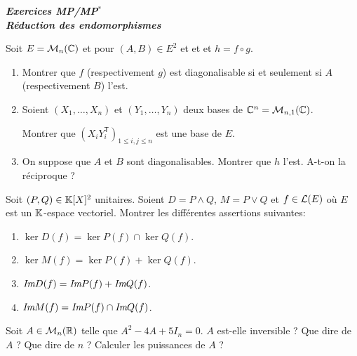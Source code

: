 \documentclass[12pt]{article}
\begin{document}
\begin{titlepage}
	\centering
	\vspace*{\fill}
	\Huge \textit{\textbf{Exercices MP/MP$^*$\\ Réduction des endomorphismes}}
	\vspace*{\fill}
\end{titlepage}

\begin{exercise}
	Soit $E=\mathcal{M}_{n}(\mathbb{C})$ et pour $(A,B)\in E^{2}$ et  et  et $h=f\circ g$.
	\begin{enumerate}
		\item Montrer que $f$ (respectivement $g$) est diagonalisable si et seulement si $A$ (respectivement $B$) l'est.
		\item Soient $(X_{1},\dots,X_{n})$ et $(Y_{1},\dots,Y_{n})$ deux bases de $\mathbb{C}^{n}=\mathcal{M}_{n,1}(\mathbb{C})$.
		
		Montrer que $(X_{i}Y_{i}^{\mathsf{T}})_{1\leqslant i,j\leqslant n}$ est une base de $E$.
		\item On suppose que $A$ et $B$ sont diagonalisables. Montrer que $h$ l'est. A-t-on la réciproque ?
	\end{enumerate}
\end{exercise}

\begin{exercise}
	Soit $(P,Q)\in\mathbb{K}[X]^{2}$ unitaires. Soient $D=P\wedge Q$, $M=P\vee Q$ et $f\in\mathcal{L}(E)$ où $E$ est un $\mathbb{K}$-espace vectoriel.
	Montrer les différentes assertions suivantes:
	\begin{enumerate}
		\item $\ker D(f)=\ker P(f)\cap \ker Q(f)$.
		\item $\ker M(f)=\ker P(f)+ \ker Q(f)$.
		\item $\emph{Im} D(f)=\emph{Im} P(f)+\emph{Im} Q(f)$.
		\item $\emph{Im} M(f)=\emph{Im} P(f)\cap\emph{Im} Q(f)$.
	\end{enumerate}
\end{exercise}

\begin{exercise}
	Soit $A\in\mathcal{M}_{n}(\mathbb{R})$ telle que $A^{2}-4A+5I_{n}=0$. $A$ est-elle inversible ? Que dire de $A$ ? Que dire de $n$ ?
	Calculer les puissances de $A$ ? 
\end{exercise}
\end{document}
